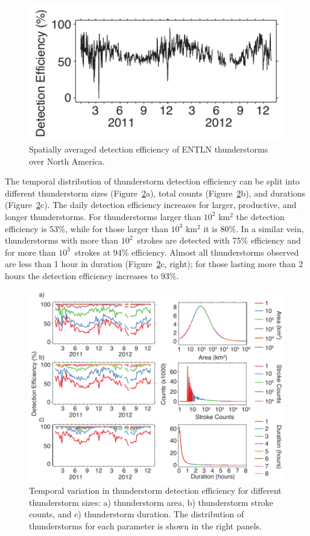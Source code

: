 \begin{figure}[ht!]
   \centering
   \includegraphics[scale=1]{thunderstorm/Figures/deDaily.pdf}
   \caption{Spatially averaged detection efficiency of ENTLN thunderstorms over North America.}
   \label{thunderstorm:fig:deDaily}
\end{figure}

The temporal distribution of thunderstorm detection efficiency can be split into different thunderstorm sizes (Figure~\ref{thunderstorm:fig:deBroken}a), total counts (Figure~\ref{thunderstorm:fig:deBroken}b), and durations (Figure~\ref{thunderstorm:fig:deBroken}c).
The daily detection efficiency increases for larger, productive, and longer thunderstorms.
For thunderstorms larger than $10^2$ km$^2$ the detection efficiency is 53\%, while for those larger than $10^3$ km$^2$ it is 80\%.
In a similar vein, thunderstorms with more than $10^2$~strokes are detected with 75\% efficiency and for more than $10^3$~strokes at 94\% efficiency.
Almost all thunderstorms observed are less than 1 hour in duration (Figure~\ref{thunderstorm:fig:deBroken}c, right); for those lasting more than 2 hours the detection efficiency increases to 93\%.

\begin{figure}[ht!]
   \centering
   \includegraphics[scale=1]{thunderstorm/Figures/deBroken.pdf}
   \caption{Temporal variation in thunderstorm detection efficiency for different thunderstorm sizes: a) thunderstorm area, b) thunderstorm stroke counts, and c) thunderstorm duration.
           The distribution of thunderstorms for each parameter is shown in the right panels.}
   \label{thunderstorm:fig:deBroken}
\end{figure}

